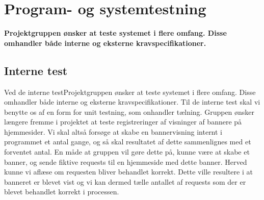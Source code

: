 \documentclass[a4paper,12pt]{article}
\begin{document}
\newpage
\section{Program- og systemtestning}

\textbf{Projektgruppen ønsker at teste systemet i flere omfang. Disse omhandler både interne og eksterne kravspecifikationer.}
\subsection{Interne test}Ved de interne testProjektgruppen ønsker at teste systemet i flere omfang. Disse omhandler både interne og eksterne kravspecifikationer. Til de interne test skal vi benytte os af en form for unit testning, som onhandler tælning. Gruppen ønsker længere fremme i projektet at teste registreringer af visninger af bannere på hjemmesider. Vi skal altså forsøge at skabe en bannervisning internt i programmet et antal gange, og så skal resultatet af dette sammenlignes med et forventet antal. En måde at gruppen vil gøre dette på, kunne være at skabe et banner, og sende fiktive requests til en hjemmeside med dette banner. Herved kunne vi aflæse om requesten bliver behandlet korrekt. Dette ville resultere i at banneret er blevet vist og vi kan dermed tælle antallet af requests som der er blevet behandlet korrekt i processen.
\end{document}
